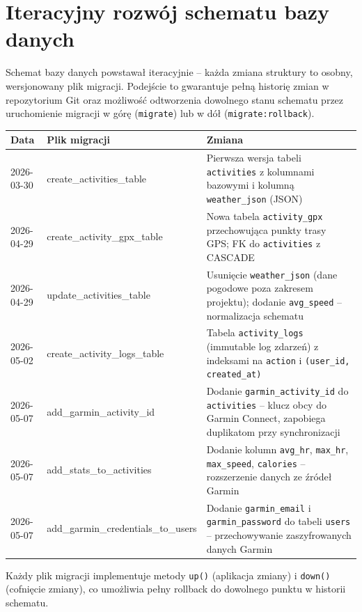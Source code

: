 \documentclass[12pt,a4paper]{report}
\begin{document}
\section{Iteracyjny rozwój schematu bazy danych}

Schemat bazy danych powstawał iteracyjnie -- każda zmiana struktury to osobny, wersjonowany plik migracji. Podejście to gwarantuje pełną historię zmian w repozytorium Git oraz możliwość odtworzenia dowolnego stanu schematu przez uruchomienie migracji w górę (\texttt{migrate}) lub w dół (\texttt{migrate:rollback}).

\begin{center}
\begin{longtable}{|l|p{4.5cm}|p{5.5cm}|}
\hline
\textbf{Data} & \textbf{Plik migracji} & \textbf{Zmiana} \\
\hline
\endhead
2026-03-30 & create\_activities\_table & Pierwsza wersja tabeli \texttt{activities} z kolumnami bazowymi i kolumną \texttt{weather\_json} (JSON) \\
\hline
2026-04-29 & create\_activity\_gpx\_table & Nowa tabela \texttt{activity\_gpx} przechowująca punkty trasy GPS; FK do \texttt{activities} z CASCADE \\
\hline
2026-04-29 & update\_activities\_table & Usunięcie \texttt{weather\_json} (dane pogodowe poza zakresem projektu); dodanie \texttt{avg\_speed} -- normalizacja schematu \\
\hline
2026-05-02 & create\_activity\_logs\_table & Tabela \texttt{activity\_logs} (immutable log zdarzeń) z indeksami na \texttt{action} i \texttt{(user\_id, created\_at)} \\
\hline
2026-05-07 & add\_garmin\_activity\_id & Dodanie \texttt{garmin\_activity\_id} do \texttt{activities} -- klucz obcy do Garmin Connect, zapobiega duplikatom przy synchronizacji \\
\hline
2026-05-07 & add\_stats\_to\_activities & Dodanie kolumn \texttt{avg\_hr}, \texttt{max\_hr}, \texttt{max\_speed}, \texttt{calories} -- rozszerzenie danych ze źródeł Garmin \\
\hline
2026-05-07 & add\_garmin\_credentials\_to\_users & Dodanie \texttt{garmin\_email} i \texttt{garmin\_password} do tabeli \texttt{users} -- przechowywanie zaszyfrowanych danych Garmin \\
\hline
\end{longtable}
\end{center}

Każdy plik migracji implementuje metody \texttt{up()} (aplikacja zmiany) i \texttt{down()} (cofnięcie zmiany), co umożliwia pełny rollback do dowolnego punktu w historii schematu.
\end{document}
